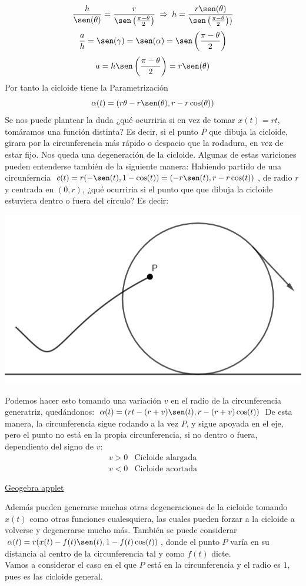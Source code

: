 \documentclass{article}
\begin{document}
$$
\frac{h}{\sen(\theta)} = \frac{r}{\sen \left( \frac{\pi-\theta}{2} \right)} \: \Rightarrow \:
h = \frac{r \sen(\theta)}{\sen \left( \frac{\pi-\theta}{2} \right))}
$$
$$
\frac{a}{h}=\sen(\gamma)= \sen(\alpha)=\sen\left( \frac{\pi-\theta}{2} \right)
$$
$$
a=h\sen\left( \frac{\pi-\theta}{2} \right)= r\sen(\theta)
$$
Por tanto la cicloide tiene la Parametrización
$$
\alpha(t)=(r\theta-r\sen(\theta),r-r\cos(\theta))
$$
Se nos puede plantear la duda ¿qué ocurriria si en vez de tomar $x(t)=rt$, tomáramos una función distinta?
Es decir, si el punto $P$ que dibuja la cicloide, girara por la circunferencia más rápido o despacio que la rodadura,
en vez de estar fijo. Nos queda una degeneración de la cicloide. Algunas de estas variciones pueden entenderse también de la
siguiente manera: Habiendo partido de una circunferncia $c(t)=r(-\sen(t),1-\cos(t))=(-r\sen(t),r-r\cos(t))$, de radio $r$
y centrada en $(0,r)$, ¿qué ocurriria si el punto que que dibuja la cicloide estuviera dentro o fuera del círculo? Es decir:\\
\begin{center}
    \includegraphics[scale=0.3]{figuras/cicloide general.PNG}
\end{center}
Podemos hacer esto tomando una variación $v$ en el radio de la circunferencia generatriz, quedándonos:
$\alpha(t)=(rt-(r+v)\sen(t),r-(r+v)\cos(t))$ De esta manera, la circunferencia sigue rodando a la vez $P$, y sigue apoyada en el eje,
pero el punto no está en la propia circunferencia, si no dentro o fuera, dependiento del signo de $v$:
$$
\begin{array}{ll}
    v>0 & \text{Cicloide alargada} \\
    v<0 & \text{Cicloide acortada}
\end{array}
$$
\begin{center}
    \href{https://www.geogebra.org/calculator/cen7wfhh}{Geogebra applet}
\end{center}
Además pueden generarse muchas otras degeneraciones de la cicloide tomando $x(t)$ como otras funciones cualesquiera,
las cuales pueden forzar a la cicloide a volverse y degenerarse mucho más. También se puede considerar
$\alpha(t)=r(x(t)-f(t)\sen(t),1-f(t)\cos(t))$, donde el punto $P$ varía en su distancia al centro de la circunferencia
tal y como $f(t)$ dicte.\\
Vamos a considerar el caso en el que $P$ está en la circunferencia y el radio es $1$, pues es las cicloide general.
\end{document}
